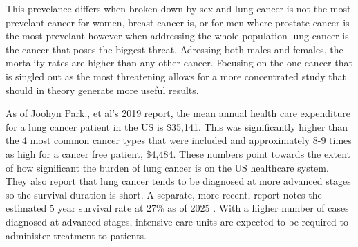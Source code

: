 \documentclass[11pt]{article}
\begin{document}
This prevelance differs when broken down by sex and lung cancer is not the most prevelant cancer for women, breast cancer is, or for men where prostate cancer is the most prevelant however when addressing the whole population lung cancer is the cancer that poses the biggest threat. Adressing both males and females, the mortality rates are higher than any other cancer. Focusing on the one cancer that is singled out as the most threatening allows for a more concentrated study that should in theory generate more useful results. 

As of Joohyn Park., et al's 2019 report\cite{Park2019}, the mean annual health care expenditure for a lung cancer patient in the US is \$35,141. This was significantly higher than the 4 most common cancer types that were included and approximately 8-9 times as high for a cancer free patient, \$4,484. These numbers point towards the extent of how significant the burden of lung cancer is on the US healthcare system. They also report that lung cancer tends to be diagnosed at more advanced stages so the survival duration is short. A separate, more recent, report notes the estimated 5 year survival rate at 27\% as of 2025 \cite{cancer}. With a higher number of cases diagnosed at advanced stages, intensive care units are expected to be required to administer treatment to patients.

\end{document}
